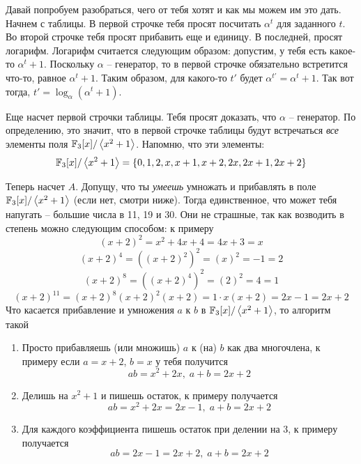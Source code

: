 \documentclass[12pt]{article} %
\begin{document}
Давай попробуем разобраться, чего от тебя хотят и как мы можем им это дать. Начнем с таблицы.
В первой строчке тебя просят посчитать $\alpha^t$ для заданного $t$. Во второй строчке тебя просят прибавить
еще и единицу. В последней, просят логарифм. Логарифм считается следующим образом: допустим, у тебя есть какое-то
$\alpha^t+1$. Поскольку $\alpha$ -- генератор, то в первой строчке обязательно встретится что-то, равное $\alpha^t+1$. Таким
образом, для какого-то $t'$ будет $\alpha^{t'}=\alpha^t+1$. Так вот тогда, $t'=\log_\alpha(\alpha^t+1)$.

Еще насчет первой строчки таблицы. Тебя просят доказать, что $\alpha$ -- генератор. По определению, это значит,
 что в первой строчке таблицы будут встречаться \textit{все} элементы поля $\mathbb{F}_3[x]/\left<x^2+1\right>$. Напомню, что эти элементы:
\[\mathbb{F}_3[x]/\left<x^2+1\right>=\left\{0,1,2,x,x+1,x+2,2x,2x+1,2x+2\right\}\]

Теперь насчет $A$. Допущу, что ты \textit{умеешь} умножать и прибавлять в поле $\mathbb{F}_3[x]/\left<x^2+1\right>$ (если нет, смотри ниже). Тогда единственное, что
может тебя напугать -- большие числа в 11, 19 и 30. Они не страшные, так как возводить в степень можно следующим способом: к примеру
\[(x+2)^2=x^2+4x+4=4x+3=x\]
\[(x+2)^4=((x+2)^2)^2=(x)^2=-1=2\]
\[(x+2)^8=((x+2)^4)^2=(2)^2=4=1\]
\[(x+2)^{11}=(x+2)^8(x+2)^2(x+2)=1\cdot x(x+2)=2x-1=2x+2\]\newpage
Что касается прибавление и умножения $a$ к $b$ в $\mathbb{F}_3[x]/\left<x^2+1\right>$, то алгоритм такой 
\begin{enumerate}
\item Просто прибавляешь (или множишь) $a$ к (на) $b$ как два многочлена, к примеру если $a=x+2$, $b=x$ у тебя получится
\[ab=x^2+2x,\;a+b=2x+2\]
\item Делишь на $x^2+1$ и пишешь остаток, к примеру получается
\[ab=x^2+2x=2x-1,\;a+b=2x+2\]
\item Для каждого коэффициента пишешь остаток при делении на 3, к примеру получается
\[ab=2x-1=2x+2,\;a+b=2x+2\]
\end{enumerate}
\end{document}
